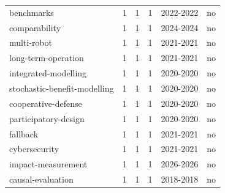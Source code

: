 \begin{table}[htbp]
{\begin{tabular}{lrrrll}
benchmarks & 1 & 1 & 1 & 2022-2022 & no \\
comparability & 1 & 1 & 1 & 2024-2024 & no \\
multi-robot & 1 & 1 & 1 & 2021-2021 & no \\
long-term-operation & 1 & 1 & 1 & 2021-2021 & no \\
integrated-modelling & 1 & 1 & 1 & 2020-2020 & no \\
stochastic-benefit-modelling & 1 & 1 & 1 & 2020-2020 & no \\
cooperative-defense & 1 & 1 & 1 & 2020-2020 & no \\
participatory-design & 1 & 1 & 1 & 2020-2020 & no \\
fallback & 1 & 1 & 1 & 2021-2021 & no \\
cybersecurity & 1 & 1 & 1 & 2021-2021 & no \\
impact-measurement & 1 & 1 & 1 & 2026-2026 & no \\
causal-evaluation & 1 & 1 & 1 & 2018-2018 & no \\
\bottomrule
\end{tabular}}
\end{table}

